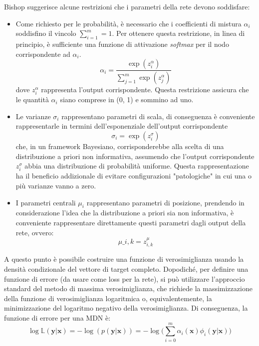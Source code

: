 Bishop suggerisce alcune restrizioni che i parametri della rete devono soddisfare:
\begin{itemize}
	\item Come richiesto per le probabilità, è necessario che i coefficienti di mistura $\alpha_i$ soddisfino il vincolo $\sum_{i=1}^m = 1$. Per ottenere questa restrizione, in linea di principio, è sufficiente una funzione di attivazione \textit{softmax} per il nodo corrispondente ad $\alpha_i$.
	\begin{equation}
		\label{softmax}
		\alpha_i = \frac{\exp(z_i^\alpha)}{\sum_{j=1}^m\exp(z_j^\alpha)}
	\end{equation}
	dove $z_i^\alpha$ rappresenta l'output corrispondente. Questa restrizione assicura che le quantità $\alpha_i$ siano comprese in (0, 1) e sommino ad uno.
	\item Le varianze $\sigma_i$ rappresentano parametri di scala, di conseguenza è conveniente rappresentarle in termini dell'esponenziale dell'output corrispondente
	\begin{equation}
		\label{exponential}
		\sigma_i = \exp(z_i^\sigma)
	\end{equation}
	che, in un framework Bayesiano, corrisponderebbe alla scelta di una distribuzione a priori non informativa, assumendo che l'output corrispondente $z_i^\sigma$ abbia una distribuzione di probabilità uniforme. Questa rappresentazione ha il beneficio addizionale di evitare configurazioni "patologiche" in cui una o più varianze vanno a zero.
	\item I parametri centrali $\mu_i$ rappresentano parametri di posizione, prendendo in considerazione l'idea che la distribuzione a priori sia non informativa, è conveniente rappresentare direttamente questi parametri dagli output della rete, ovvero:
	\begin{equation}
		\label{mus}
		\mu\_{i,k} = z_{i,k}^\mu
	\end{equation}
\end{itemize}

A questo punto è possibile costruire una funzione di verosimiglianza usando la densità condizionale del vettore di target completo. Dopodiché, per definire una funzione di errore (da usare come loss per la rete), si può utilizzare l'approccio standard del metodo di massima verosimiglianza, che richiede la massimizzazione della funzione di verosimiglianza logaritmica o, equivalentemente, la minimizzazione del logaritmo negativo della verosimiglianza. Di conseguenza, la funzione di errore per una MDN è:
\begin{equation}
	\label{mdnerror}
	\log\mathbb{L}(\boldsymbol{y} | \boldsymbol{x}) = - \log(p(\boldsymbol{y} | \boldsymbol{x})) = - \log\bigg(\sum_{i=0}^m \alpha_i(\boldsymbol{x})\phi_i(\boldsymbol{y} | \boldsymbol{x})\bigg)
\end{equation}
